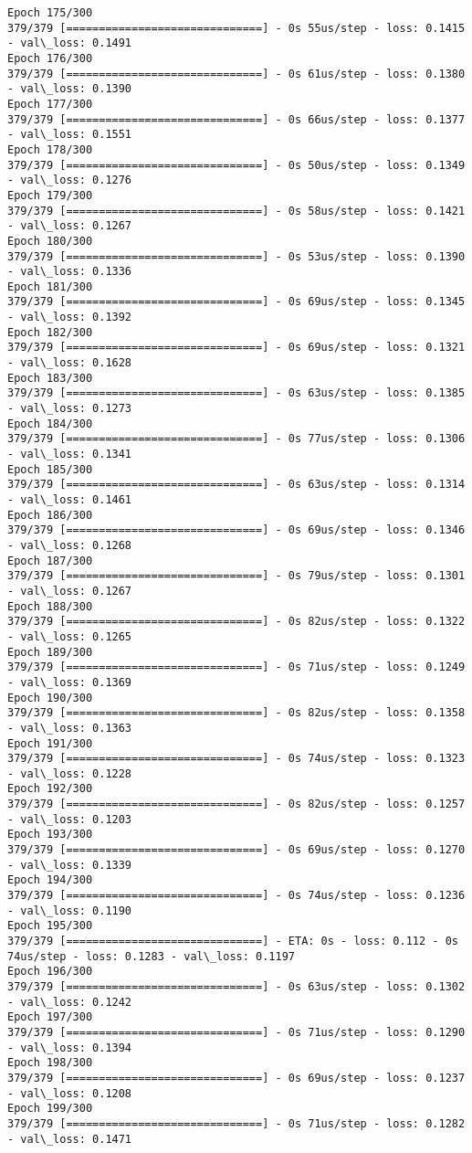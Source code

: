 \documentclass[11pt]{article}
\begin{document}
\begin{Verbatim}[commandchars=\\\{\}]
Epoch 175/300
379/379 [==============================] - 0s 55us/step - loss: 0.1415 - val\_loss: 0.1491
Epoch 176/300
379/379 [==============================] - 0s 61us/step - loss: 0.1380 - val\_loss: 0.1390
Epoch 177/300
379/379 [==============================] - 0s 66us/step - loss: 0.1377 - val\_loss: 0.1551
Epoch 178/300
379/379 [==============================] - 0s 50us/step - loss: 0.1349 - val\_loss: 0.1276
Epoch 179/300
379/379 [==============================] - 0s 58us/step - loss: 0.1421 - val\_loss: 0.1267
Epoch 180/300
379/379 [==============================] - 0s 53us/step - loss: 0.1390 - val\_loss: 0.1336
Epoch 181/300
379/379 [==============================] - 0s 69us/step - loss: 0.1345 - val\_loss: 0.1392
Epoch 182/300
379/379 [==============================] - 0s 69us/step - loss: 0.1321 - val\_loss: 0.1628
Epoch 183/300
379/379 [==============================] - 0s 63us/step - loss: 0.1385 - val\_loss: 0.1273
Epoch 184/300
379/379 [==============================] - 0s 77us/step - loss: 0.1306 - val\_loss: 0.1341
Epoch 185/300
379/379 [==============================] - 0s 63us/step - loss: 0.1314 - val\_loss: 0.1461
Epoch 186/300
379/379 [==============================] - 0s 69us/step - loss: 0.1346 - val\_loss: 0.1268
Epoch 187/300
379/379 [==============================] - 0s 79us/step - loss: 0.1301 - val\_loss: 0.1267
Epoch 188/300
379/379 [==============================] - 0s 82us/step - loss: 0.1322 - val\_loss: 0.1265
Epoch 189/300
379/379 [==============================] - 0s 71us/step - loss: 0.1249 - val\_loss: 0.1369
Epoch 190/300
379/379 [==============================] - 0s 82us/step - loss: 0.1358 - val\_loss: 0.1363
Epoch 191/300
379/379 [==============================] - 0s 74us/step - loss: 0.1323 - val\_loss: 0.1228
Epoch 192/300
379/379 [==============================] - 0s 82us/step - loss: 0.1257 - val\_loss: 0.1203
Epoch 193/300
379/379 [==============================] - 0s 69us/step - loss: 0.1270 - val\_loss: 0.1339
Epoch 194/300
379/379 [==============================] - 0s 74us/step - loss: 0.1236 - val\_loss: 0.1190
Epoch 195/300
379/379 [==============================] - ETA: 0s - loss: 0.112 - 0s 74us/step - loss: 0.1283 - val\_loss: 0.1197
Epoch 196/300
379/379 [==============================] - 0s 63us/step - loss: 0.1302 - val\_loss: 0.1242
Epoch 197/300
379/379 [==============================] - 0s 71us/step - loss: 0.1290 - val\_loss: 0.1394
Epoch 198/300
379/379 [==============================] - 0s 69us/step - loss: 0.1237 - val\_loss: 0.1208
Epoch 199/300
379/379 [==============================] - 0s 71us/step - loss: 0.1282 - val\_loss: 0.1471

\end{Verbatim}
\end{document}
